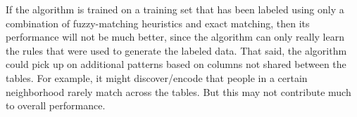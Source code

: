 \documentclass[11pt]{article}
\begin{document}
\begin{enumerate}
        If the algorithm is trained on a training set that has been labeled
        using only a combination of fuzzy-matching heuristics and exact
        matching, then its performance will not be much better, since the
        algorithm can only really learn the rules that were used to generate
        the labeled data. That said, the algorithm could pick up on additional
        patterns based on columns not shared between the tables. For example,
        it might discover/encode that people in a certain neighborhood rarely
        match across the tables. But this may not contribute much to overall
        performance.
\end{enumerate}
\end{document}
